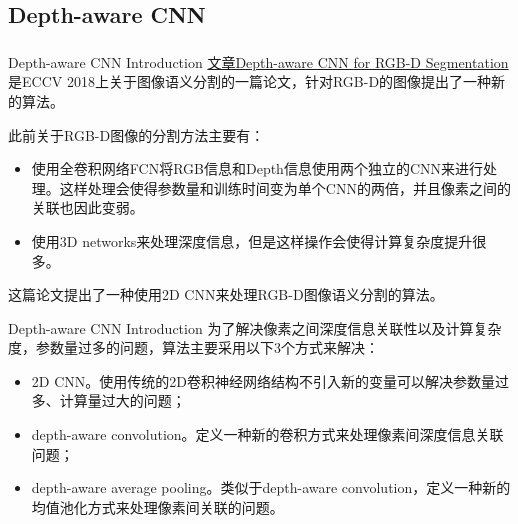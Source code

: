 \documentclass{beamer}
\newcommand{\upcite}[1]{\textsuperscript{\textsuperscript{\cite{#1}}}}
\begin{document}
\subsection{Depth-aware CNN}
\begin{frame}{Depth-aware CNN Introduction}
\href{http://openaccess.thecvf.com/content_ECCV_2018/papers/Weiyue_Wang_Depth-aware_CNN_for_ECCV_2018_paper.pdf}{文章Depth-aware CNN for RGB-D Segmentation}\upcite{wang2018depth} 是ECCV 2018上关于图像语义分割的一篇论文，针对RGB-D的图像提出了一种新的算法。

此前关于RGB-D图像的分割方法主要有：
\begin{itemize}
	\item 使用全卷积网络FCN将RGB信息和Depth信息使用两个独立的CNN来进行处理。这样处理会使得参数量和训练时间变为单个CNN的两倍，并且像素之间的关联也因此变弱。
	\item 使用3D networks来处理深度信息，但是这样操作会使得计算复杂度提升很多。
\end{itemize}
这篇论文提出了一种使用2D CNN来处理RGB-D图像语义分割的算法。
\end{frame}

\begin{frame}{Depth-aware CNN Introduction}
为了解决像素之间深度信息关联性以及计算复杂度，参数量过多的问题，算法主要采用以下3个方式来解决：
\begin{itemize}
	\item 2D CNN。使用传统的2D卷积神经网络结构不引入新的变量可以解决参数量过多、计算量过大的问题；
	\item depth-aware convolution。定义一种新的卷积方式来处理像素间深度信息关联问题；
	\item depth-aware average pooling。类似于depth-aware convolution，定义一种新的均值池化方式来处理像素间关联的问题。
\end{itemize}
\end{frame}
\end{document}
